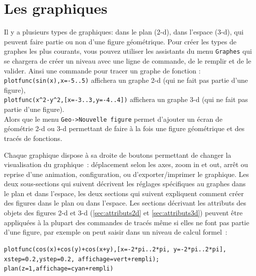 \documentclass[a4paper,11pt]{article}
\begin{document}
\section{Les graphiques}
Il y a plusieurs types de graphiques: dans le plan (2-d), dans
l'espace (3-d), qui peuvent faire partie ou non d'une figure
g\'eom\'etrique. Pour cr\'eer les types de graphes les plus courants,
vous pouvez utiliser les assistants du menu {\tt Graphes} qui
se chargera de cr\'eer un niveau avec une ligne de commande, de le
remplir et de le valider.
Ainsi une commande pour tracer un graphe de fonction :\\
\verb|plotfunc(sin(x),x=-5..5)| affichera un graphe 2-d (qui ne fait
pas partie d'une figure),\\
\verb|plotfunc(x^2-y^2,[x=-3..3,y=-4..4])|
affichera un graphe 3-d (qui ne fait pas partie d'une figure).\\
Alors que le menu \verb|Geo->Nouvelle figure| 
permet d'ajouter un \'ecran de 
g\'eom\'etrie 2-d ou 3-d permettant de faire \`a la fois une figure 
g\'eom\'etrique et des trac\'es de fonctions.

Chaque graphique dispose \`a sa droite de boutons permettant de changer
la visualisation du graphique~: d\'eplacement selon les axes, zoom in et
out, arr\^et ou reprise d'une animation, configuration, ou
d'exporter/imprimer le graphique. Les deux sous-sections qui suivent
d\'ecrivent les r\'eglages sp\'ecifiques au graphes dans le plan et dans
l'espace, les deux sections qui suivent expliquent comment cr\'eer
des figures dans le plan ou dans l'espace. Les sections d\'ecrivant les
attributs des objets des figures 2-d et 3-d (\ref{sec:attributs2d}
et \ref{sec:attributs3d}) peuvent \^etre appliqu\'ees
\`a la plupart des commandes de trac\'es m\^eme si elles ne font pas partie d'une
figure, par exemple on peut saisir dans un niveau de calcul formel~:
\begin{center}
{\tt plotfunc(cos(x)+cos(y)+cos(x+y),[x=-2*pi..2*pi, y=-2*pi..2*pi],
xstep=0.2,ystep=0.2, affichage=vert+rempli);\\
plan(z=1,affichage=cyan+rempli)}
\end{center}
\end{document}
